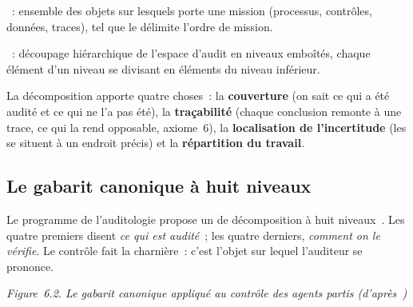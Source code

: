\begin{boxdef}
~: ensemble des objets sur
lesquels porte une mission (processus, contrôles, données, traces), tel que
le délimite l'ordre de mission.

\medskip
{}~: découpage hiérarchique de
l'espace d'audit en niveaux emboîtés, chaque élément d'un niveau se divisant
en éléments du niveau inférieur.
\end{boxdef}

La décomposition apporte quatre choses~: la \textbf{couverture} (on sait ce
qui a été audité et ce qui ne l'a pas été), la \textbf{traçabilité} (chaque
conclusion remonte à une trace, ce qui la rend opposable, axiome~6), la
\textbf{localisation de l'incertitude} (les \NEK{} se situent à un endroit
précis) et la \textbf{répartition du travail}.

\subsection{Le gabarit canonique à huit niveaux}

Le programme de l'auditologie propose un  de décomposition à huit
niveaux~\cite{minka2026auditologie}. Les quatre premiers disent \emph{ce
qui est audité}~; les quatre derniers, \emph{comment on le vérifie}. Le
contrôle fait la charnière~: c'est l'objet sur lequel l'auditeur se
prononce.

\begin{center}
\end{center}
\vspace{-0.2em}
\begin{center}{\small\itshape Figure~6.2. Le gabarit canonique appliqué au
contrôle des agents partis (d'après~\cite{minka2026auditologie})}\end{center}

